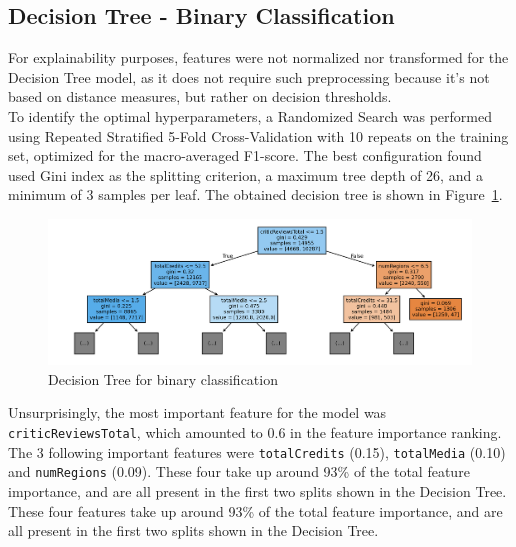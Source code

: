 \subsection{Decision Tree - Binary Classification}
For explainability purposes, features were not normalized nor transformed for the Decision Tree model,
as it does not require such preprocessing because it's not based on distance measures, but rather on
decision thresholds.\\
To identify the optimal hyperparameters, a Randomized Search was performed
using Repeated Stratified 5-Fold Cross-Validation with 10 repeats on the training set, optimized for
the macro-averaged F1-score.
The best configuration found used Gini index as the splitting criterion,
a maximum tree depth of 26, and a minimum of 3 samples per leaf.
The obtained decision tree is shown in Figure~\ref{fig:binary_dt}.
\begin{figure}[H]
    \centering
    \includegraphics[width=0.8\linewidth]{plots/binary_dt.png}
    \captionsetup{justification=centering, width=0.9\linewidth}
    \caption{Decision Tree for binary classification}
    \label{fig:binary_dt}
\end{figure}

Unsurprisingly, the most important feature for the model was \texttt{criticReviewsTotal},
which amounted to 0.6 in the feature importance ranking. The 3 following important
features were \texttt{totalCredits} (0.15), \texttt{totalMedia} (0.10) and \texttt{numRegions} (0.09).
These four take up around 93\% of the total feature importance, and are all present in the first
two splits shown in the Decision Tree.\\
These four features take up around 93\% of the total feature importance, and are all present in the first
two splits shown in the Decision Tree.

